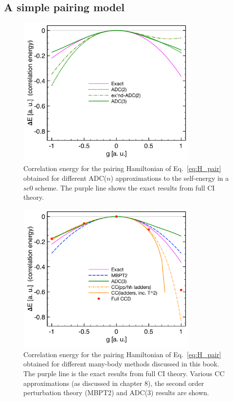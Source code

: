 \subsection{A simple pairing model}

\begin{figure}[ht]
\begin{center}
\includegraphics[width=0.8\textwidth]{Chapter11-figures/Pairing_LNP_scgf.pdf}
\caption{Correlation energy for the pairing Hamiltonian of Eq.~\eqref{eq:H_pair} obtained for different  ADC($n$) approximations
to the self-energy in a $sc0$ scheme. The purple line shows the exact results from full CI theory.  }
\label{fig:pairng_adc}
\end{center}
\end{figure}

\begin{figure}[ht]
\begin{center}
\includegraphics[width=0.8\textwidth]{Chapter11-figures/Pairing_LNP_ALL.pdf}
\caption{Correlation energy for the pairing Hamiltonian of Eq.~\eqref{eq:H_pair} obtained for different
many-body methods discussed in this book. The purple line is the exact results from full CI theory. Various CC approximations (as discussed in
chapter 8), the  second order perturbation theory (MBPT2)  and ADC(3) results are shown.}
\label{fig:pairng_all}
\end{center}
\end{figure}

